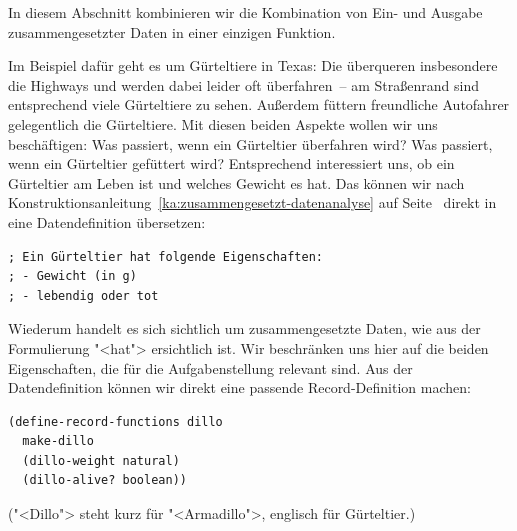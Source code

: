 In diesem Abschnitt kombinieren wir die Kombination von Ein- und
Ausgabe zusammengesetzter Daten in einer einzigen Funktion.

Im Beispiel dafür geht es um Gürteltiere in Texas:
Die überqueren insbesondere die Highways
und werden dabei leider oft überfahren~-- am Straßenrand
sind entsprechend viele Gürteltiere zu sehen.  Außerdem füttern
freundliche Autofahrer gelegentlich die Gürteltiere.  Mit diesen
beiden Aspekte wollen wir uns beschäftigen: Was passiert, wenn ein
Gürteltier überfahren wird?  Was passiert, wenn ein Gürteltier
gefüttert wird?  Entsprechend interessiert uns, ob ein Gürteltier am
Leben ist und welches Gewicht es hat.  Das können wir nach
Konstruktionsanleitung~\ref{ka:zusammengesetzt-datenanalyse} auf
Seite~\pageref{ka:zusammengesetzt-datenanalyse} direkt in eine
Datendefinition übersetzen:
%
\begin{verbatim}
; Ein Gürteltier hat folgende Eigenschaften:
; - Gewicht (in g)
; - lebendig oder tot
\end{verbatim}
%
Wiederum handelt es sich sichtlich um zusammengesetzte Daten, wie
aus der Formulierung "<hat"> ersichtlich ist.  Wir beschränken uns
hier auf die beiden Eigenschaften, die für die Aufgabenstellung
relevant sind.
Aus der Datendefinition können wir direkt eine passende
Record-Definition machen:
% 
\begin{verbatim}
(define-record-functions dillo
  make-dillo
  (dillo-weight natural)
  (dillo-alive? boolean))
\end{verbatim}
%
("<Dillo"> steht kurz für "<Armadillo">, englisch für Gürteltier.)

